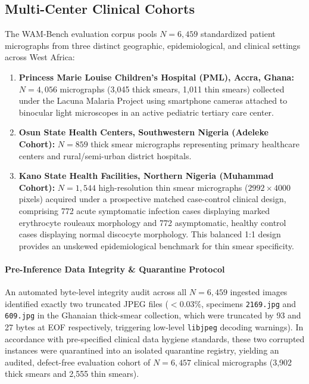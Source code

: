 \documentclass[a4paper,11pt]{article}
\begin{document}
\vspace{0.4em}

\subsection{Multi-Center Clinical Cohorts}
The WAM-Bench evaluation corpus pools $N = 6,459$ standardized patient micrographs from three distinct geographic, epidemiological, and clinical settings across West Africa:
\begin{enumerate}
    \item \textbf{Princess Marie Louise Children's Hospital (PML), Accra, Ghana:} $N = 4,056$ micrographs (3,045 thick smears, 1,011 thin smears) collected under the Lacuna Malaria Project using smartphone cameras attached to binocular light microscopes in an active pediatric tertiary care center.
    \item \textbf{Osun State Health Centers, Southwestern Nigeria (Adeleke Cohort):} $N = 859$ thick smear micrographs representing primary healthcare centers and rural/semi-urban district hospitals.
    \item \textbf{Kano State Health Facilities, Northern Nigeria (Muhammad Cohort):} $N = 1,544$ high-resolution thin smear micrographs ($2992 \times 4000$ pixels) acquired under a prospective matched case-control clinical design, comprising 772 acute symptomatic infection cases displaying marked erythrocyte rouleaux morphology and 772 asymptomatic, healthy control cases displaying normal discocyte morphology. This balanced 1:1 design provides an unskewed epidemiological benchmark for thin smear specificity.
\end{enumerate}

\paragraph{Pre-Inference Data Integrity \& Quarantine Protocol}
An automated byte-level integrity audit across all $N = 6,459$ ingested images identified exactly two truncated JPEG files ($<0.03\%$, specimens \texttt{2169.jpg} and \texttt{609.jpg} in the Ghanaian thick-smear collection, which were truncated by 93 and 27 bytes at EOF respectively, triggering low-level \texttt{libjpeg} decoding warnings). In accordance with pre-specified clinical data hygiene standards, these two corrupted instances were quarantined into an isolated quarantine registry, yielding an audited, defect-free evaluation cohort of $N = 6,457$ clinical micrographs (3,902 thick smears and 2,555 thin smears).
\end{document}
